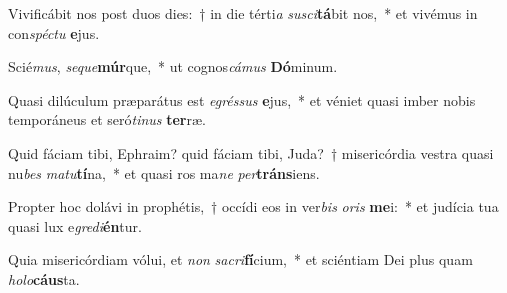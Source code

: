 \item Vivificábit nos post duos dies:~† in die térti\textit{a} \textit{su}\textit{sci}\textbf{tá}bit nos,~* et vivémus in con\textit{spéc}\textit{tu} \textbf{e}jus.
\item Scié\textit{mus}, \textit{se}\textit{que}\textbf{múr}que,~* ut cognos\textit{cá}\textit{mus} \textbf{Dó}minum.
\item Quasi dilúculum præparátus est \textit{e}\textit{grés}\textit{sus} \textbf{e}jus,~* et véniet quasi imber nobis temporáneus et seró\textit{ti}\textit{nus} \textbf{ter}ræ.
\item Quid fáciam tibi, Ephraim? quid fáciam tibi, Juda?~† misericórdia vestra quasi nu\textit{bes} \textit{ma}\textit{tu}\textbf{tí}na,~* et quasi ros ma\textit{ne} \textit{per}\textbf{tráns}iens.
\item Propter hoc dolávi in prophétis,~† occídi eos in ver\textit{bis} \textit{o}\textit{ris} \textbf{me}i:~* et judícia tua quasi lux e\textit{gre}\textit{di}\textbf{én}tur.
\item Quia misericórdiam vólui, et \textit{non} \textit{sa}\textit{cri}\textbf{fí}cium,~* et sciéntiam Dei plus quam \textit{ho}\textit{lo}\textbf{cáus}ta.
